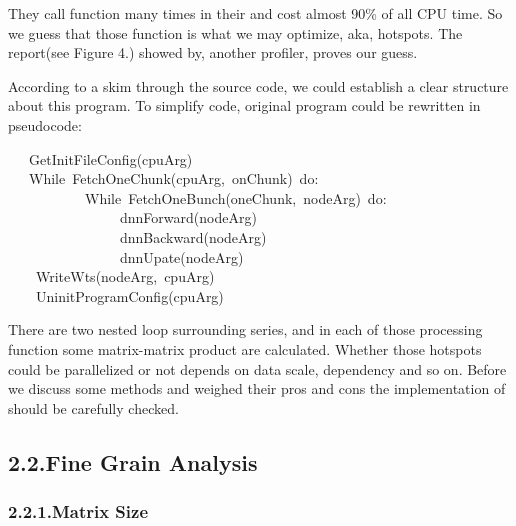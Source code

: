 \documentclass{article}
\begin{document}
\noindent{}They call  function  many times in their  and 
cost almost 90\% of all CPU time. So we guess that those function
 is what we may optimize, aka, hotspots. The report(see Figure 4.) showed by, another profiler, proves our guess.%

According to a skim through the source code, we could establish a clear structure about this program. To simplify code, original program could be rewritten in pseudocode:%
\begin{mdpre}%
\noindent~~~{GetInitFileConfig}(cpuArg)\\
~~~{While}~{FetchOneChunk}(cpuArg,~onChunk)~{do}:\\
~~~~~~~~~~~{While}~{FetchOneBunch}(oneChunk,~nodeArg)~{do}:\\
~~~~~~~~~~~~~~~~dnnForward(nodeArg)\\
~~~~~~~~~~~~~~~~dnnBackward(nodeArg)\\
~~~~~~~~~~~~~~~~dnnUpate(nodeArg)\\
~~~~{WriteWts}(nodeArg,~cpuArg)\\
~~~~{UninitProgramConfig}(cpuArg)\\
\end{mdpre}\noindent{}There are two nested loop surrounding  series, and 
in each of those processing function some matrix-matrix product are
calculated. Whether those hotspots could be parallelized or not depends
on data scale, dependency and so on. Before we discuss some methods and weighed their pros and cons the implementation of  should be carefully checked.

\subsection{2.2.\hspace*{0.5em}Fine Grain Analysis}\label{sec-fine-grain-analysis}%

\subsubsection{2.2.1.\hspace*{0.5em}Matrix Size}\label{sec-matrix-size}%
\end{document}
